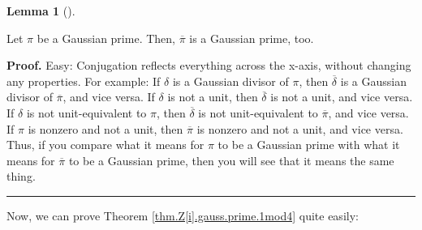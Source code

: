 \documentclass[numbers=enddot,12pt,final,onecolumn,notitlepage]{scrartcl}%
\numberwithin{exer}{subsection}
\theoremstyle{definition}
\newtheorem{lem}[theo]{Lemma}
\newenvironment{lemma}[1][]
{\begin{lem}[#1]\begin{leftbar}}
{\end{leftbar}\end{lem}}
\newenvironment{proof}[1][Proof]{\noindent\textbf{#1.} }{\ \rule{0.5em}{0.5em}}
\begin{document}
\begin{lemma}
\label{lem.Z[i].prime.conj}Let $\pi$ be a Gaussian prime. Then, $\overline
{\pi}$ is a Gaussian prime, too.
\end{lemma}

\begin{proof}
Easy: Conjugation reflects everything across the x-axis, without changing any
properties. For example: If $\delta$ is a Gaussian divisor of $\pi$, then
$\overline{\delta}$ is a Gaussian divisor of $\overline{\pi}$, and vice versa.
If $\delta$ is not a unit, then $\overline{\delta}$ is not a unit, and vice
versa. If $\delta$ is not unit-equivalent to $\pi$, then $\overline{\delta}$
is not unit-equivalent to $\overline{\pi}$, and vice versa. If $\pi$ is
nonzero and not a unit, then $\overline{\pi}$ is nonzero and not a unit, and
vice versa. Thus, if you compare what it means for $\pi$ to be a Gaussian
prime with what it means for $\overline{\pi}$ to be a Gaussian prime, then you
will see that it means the same thing.
\end{proof}

Now, we can prove Theorem \ref{thm.Z[i].gauss.prime.1mod4} quite easily:
\end{document}
